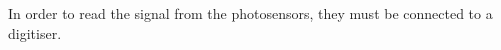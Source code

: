 In order to read the signal from the photosensors, they must be connected to a digitiser. 














